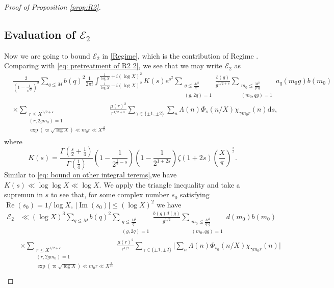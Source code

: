 \documentclass[12pt,reqno]{amsart}
\numberwithin{equation}{section}
\theoremstyle{plain}
\theoremstyle{definition}
\theoremstyle{remark}
\renewcommand{\Re}{\operatorname{Re}}
\renewcommand{\Im}{\operatorname{Im}}
\newcommand{\dd}{\mathrm{d}}
\begin{document}
\begin{proof}[Proof of Proposition \ref{prop:R2}]
\subsection{Evaluation of $\mathcal{E}_2$}
Now we are going to bound $\mathcal{E}_2$ in \eqref{Regime}, which is the contribution of Regime \uppercase\expandafter{}. Comparing with \eqref{eq: pretreatment of R2 2}, we see that we may write $\mathcal{E}_2$ as
\begin{equation*}
\begin{split}
&\frac{2}{\left( 1-\frac{1}{\sqrt{2}}\right)^2}
\sum_{q\leq M}{b(q)}^2\frac{1}{2 \pi i} \int_{\frac{1}{\log X}-i(\log X)^2}^{\frac{1}{\log X}+i(\log X)^2} K(s) e^{s^2}\sum_{\substack{g \leq \frac{M^2}{q^2} \\
(g, 2q)=1}} \frac{b(g)}{g^{1/2+s}} \sum_{\substack{m_0 \leq \frac{M^2}{q^2g}\\
(m_0, q g)=1}} a_q(m_0g)b(m_0) \\
&\times \sum_{\substack{r \leq X ^{1 / 2+\varepsilon} \\
(r, 2 gm_0)=1\\
  \exp(\varpi \sqrt{\log X}) \ll  m_0r \ll X^{\frac{2}{15}}}} \frac{\mu(r)^2}{r^{1 / 2+s}} \sum_{\gamma \in\{ \pm 1, \pm 2\}} \sum_n \Lambda(n) \Phi_s(n / X) \chi_{\gamma m_0 r}(n) \dd  s,
\end{split}
\end{equation*}
where
\begin{equation*}
K(s) = \frac{\Gamma(\frac{s}{2}+\frac{1}{4})}{\Gamma(\frac{1}{4})} \left( 1-\frac{1}{2^{\frac{1}{2}-s}}\right)\left(1 - \frac{1}{2^{1+2s}}\right)\zeta(1+2s)\left(\frac{X}{\pi}\right)^{\frac{s}{2}}.
\end{equation*}
Similar to \eqref{eq: bound on other integral terems},we have $K(s)\ll \log \log X \ll \log X $. We apply the triangle inequality and take a supremun in $s$ to see that, for some complex number $s_0$ satisfying $\Re(s_0)=1/\log X$, $|\Im(s_0)|\leq (\log X)^2$ we have
\begin{align}\label{Reg2ineq1}
\mathcal{E}_2 &\ll
(\log X)^3\sum_{q\leq M}{b(q)}^2
\sum_{\substack{g \leq \frac{M^2}{q^2} \\
(g, 2q)=1}} \frac{b(g)d(g)}{g^{1/2}}
\sum_{\substack{m_0 \leq \frac{M^2}{q^2g}\\
(m_0, q g)=1}} d(m_0)b(m_0) \nonumber\\
&\times \sum_{\substack{r \leq X ^{1 / 2+\varepsilon} \\
(r, 2 gm_0)=1 \\
\exp(\varpi \sqrt{\log X}) \ll  m_0r \ll X^{\frac{2}{15}}}} \frac{\mu(r)^2}{r^{1 / 2}} \sum_{\gamma \in\{ \pm 1, \pm 2\}}\Big |\sum_n \Lambda(n) \Phi_{s_0}(n / X) \chi_{\gamma m_0 r}(n)\Big|\nonumber\\

\end{align}
\end{proof}
\end{document}

